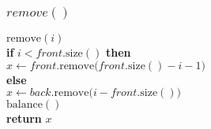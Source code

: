 \documentclass{beamer}
\begin{document}
\begin{frame}
\frametitle{$remove()$}
\begin{oframed}
\begin{flushleft}
\hspace*{1em} $\ensuremath{\mathrm{remove}(\ensuremath{\mathit{i}})}$\\
\hspace*{1em} \hspace*{1em} {\color{black} \textbf{if}} $\ensuremath{\ensuremath{\mathit{i}} < \ensuremath{\mathit{front}}.\mathrm{size}()}$ {\color{black} \textbf{then}} \\
\hspace*{1em} \hspace*{1em} \hspace*{1em} $\ensuremath{\ensuremath{\mathit{x}} \gets  \ensuremath{\ensuremath{\mathit{front}}.\mathrm{remove}(\ensuremath{\mathit{front}}.\mathrm{size}()-\ensuremath{\mathit{i}}-1})}$\\
\hspace*{1em} \hspace*{1em} {\color{black} \textbf{else}} \\
\hspace*{1em} \hspace*{1em} \hspace*{1em} $\ensuremath{\ensuremath{\mathit{x}} \gets  \ensuremath{\ensuremath{\mathit{back}}.\mathrm{remove}(\ensuremath{\mathit{i}}-\ensuremath{\mathit{front}}.\mathrm{size}()})}$\\
\hspace*{1em} \hspace*{1em} $\ensuremath{\mathrm{balance}()}$\\
\hspace*{1em} \hspace*{1em} {\color{black} \textbf{return}} $\ensuremath{\ensuremath{\mathit{x}}}$\\
\end{flushleft}
\end{oframed}
\end{frame}
\end{document}
